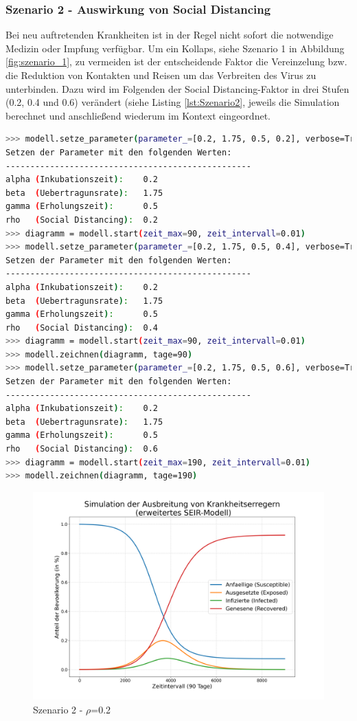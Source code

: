 \documentclass[12pt]{article}
\begin{document}
\subsubsection{Szenario 2 - Auswirkung von Social Distancing}
Bei neu auftretenden Krankheiten ist in der Regel nicht sofort die notwendige Medizin oder Impfung verfügbar. Um ein Kollaps, siehe Szenario 1 in Abbildung \ref{fig:szenario_1}, zu vermeiden ist der entscheidende Faktor die Vereinzelung bzw. die Reduktion von Kontakten und Reisen um das Verbreiten des Virus zu unterbinden. Dazu wird im Folgenden der Social Distancing-Faktor in drei Stufen (0.2, 0.4 und 0.6) verändert (siehe Listing \ref{lst:Szenario2}, jeweils die Simulation berechnet und anschließend wiederum im Kontext eingeordnet.

\begin{lstlisting}[language=Bash, caption=Szenario 2 - Social Distancing, label=lst:Szenario2]
>>> modell.setze_parameter(parameter_=[0.2, 1.75, 0.5, 0.2], verbose=True)
Setzen der Parameter mit den folgenden Werten:
--------------------------------------------------
alpha (Inkubationszeit):    0.2
beta  (Uebertragunsrate):   1.75
gamma (Erholungszeit):      0.5
rho   (Social Distancing):  0.2
>>> diagramm = modell.start(zeit_max=90, zeit_intervall=0.01)
>>> modell.setze_parameter(parameter_=[0.2, 1.75, 0.5, 0.4], verbose=True)
Setzen der Parameter mit den folgenden Werten:
--------------------------------------------------
alpha (Inkubationszeit):    0.2
beta  (Uebertragunsrate):   1.75
gamma (Erholungszeit):      0.5
rho   (Social Distancing):  0.4
>>> diagramm = modell.start(zeit_max=90, zeit_intervall=0.01)
>>> modell.zeichnen(diagramm, tage=90)
>>> modell.setze_parameter(parameter_=[0.2, 1.75, 0.5, 0.6], verbose=True)
Setzen der Parameter mit den folgenden Werten:
--------------------------------------------------
alpha (Inkubationszeit):    0.2
beta  (Uebertragunsrate):   1.75
gamma (Erholungszeit):      0.5
rho   (Social Distancing):  0.6
>>> diagramm = modell.start(zeit_max=190, zeit_intervall=0.01)
>>> modell.zeichnen(diagramm, tage=190)
\end{lstlisting}

\begin{figure}[H]
\centering
\includegraphics[scale=0.4]{Szenario_2_rho_0.2}
\caption{Szenario 2 - $\rho$=0.2}
\label{fig:szenario_2_0.2}
\end{figure}
\end{document}

